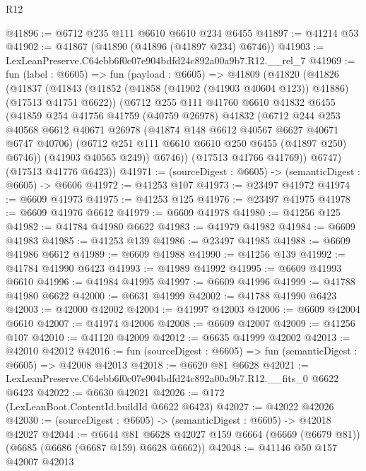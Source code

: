 \begin{lexlean}{R12}
\begin{coremodule}
@41896 := @6712 @235 @111 @6610 @6610 @234 @6455
@41897 := @41214 @53
@41902 := @41867 (@41890 (@41896 (@41897 @234) @6746))
@41903 := LexLeanPreserve.C64ebb6f0c07e904bdfd24c892a00a9b7.R12.__rel_7
@41969 := fun (label : @6605) =>
  fun (payload : @6605) =>
  @41809
    (@41820
      (@41826
        (@41837
          (@41843
            (@41852 (@41858 (@41902 (@41903 @40604 @123)) @41886) (@17513 @41751 @6622))
            (@6712
              @255
              @111
              @41760
              @6610
              @41832
              @6455
              (@41859
                @254
                @41756
                @41759
                (@40759 @26978)
                @41832
                (@6712
                  @244
                  @253
                  @40568
                  @6612
                  @40671
                  @26978
                  (@41874 @148 @6612 @40567 @6627 @40671 @6747 @40706)
                  (@6712 @251 @111 @6610 @6610 @250 @6455 (@41897 @250) @6746))
                (@41903 @40565 @249))
              @6746))
          (@17513 @41766 @41769))
        @6747)
      (@17513 @41776 @6423))
@41971 := (sourceDigest : @6605) -> (semanticDigest : @6605) -> @6606
@41972 := @41253 @107
@41973 := @23497 @41972
@41974 := @6609 @41973
@41975 := @41253 @125
@41976 := @23497 @41975
@41978 := @6609 @41976 @6612
@41979 := @6609 @41978
@41980 := @41256 @125
@41982 := @41784 @41980 @6622
@41983 := @41979 @41982
@41984 := @6609 @41983
@41985 := @41253 @139
@41986 := @23497 @41985
@41988 := @6609 @41986 @6612
@41989 := @6609 @41988
@41990 := @41256 @139
@41992 := @41784 @41990 @6423
@41993 := @41989 @41992
@41995 := @6609 @41993 @6610
@41996 := @41984 @41995
@41997 := @6609 @41996
@41999 := @41788 @41980 @6622
@42000 := @6631 @41999
@42002 := @41788 @41990 @6423
@42003 := @42000 @42002
@42004 := @41997 @42003
@42006 := @6609 @42004 @6610
@42007 := @41974 @42006
@42008 := @6609 @42007
@42009 := @41256 @107
@42010 := @41120 @42009
@42012 := @6635 @41999 @42002
@42013 := @42010 @42012
@42016 := fun (sourceDigest : @6605) => fun (semanticDigest : @6605) => @42008 @42013
@42018 := @6620 @81 @6628
@42021 := LexLeanPreserve.C64ebb6f0c07e904bdfd24c892a00a9b7.R12.__fits_0 @6622 @6423
@42022 := @6630 @42021
@42026 := @172 (LexLeanBoot.ContentId.buildId @6622 @6423)
@42027 := @42022 @42026
@42030 := (sourceDigest : @6605) -> (semanticDigest : @6605) -> @42018 @42027
@42044 := @6644
    @81
    @6628
    @42027
    @159
    @6664
    (@6669 (@6679 @81))
    (@6685 (@6686 (@6687 @159) @6628 @6662))
@42048 := @41146 @50 @157 @42007 @42013

\end{coremodule}
\end{lexlean}

